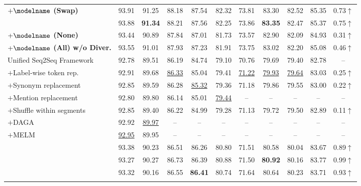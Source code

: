 \begin{table*}[th!]
{\begin{tabular}{lcccccccccc}
\multicolumn{1}{l}{\textbf{$+\modelname$ (Swap)}} &93.91	&91.25&	88.18	&87.54	&82.32	&73.81	&83.30	&82.52 &85.35 &\color{red}0.73$\uparrow$ \\
\rowcolor{gray!10}
\multicolumn{1}{l}{\textbf{$+\modelname$ (All)}} &93.88	&\textbf{91.34}  &	88.21	&87.56	&82.25	&73.86&	\textbf{83.35}&	82.47  &85.37 &\color{red}0.75$\uparrow$ \\
\cmidrule{2-11} 
\multicolumn{1}{l}{\textbf{$+\modelname$ (None)}} &93.44 &90.89 &87.84 &87.01 &81.73 &73.57 &82.90 &82.09  &84.93 &\color{red}0.31$\uparrow$ \\
\multicolumn{1}{l}{\textbf{$+\modelname$ (All) w/o Diver.}} &93.55 &91.01 &87.93 &87.23 &81.91 &73.75 &83.02 &82.20  &85.08 &\color{red}0.46$\uparrow$ \\
\midrule 
\midrule 
Unified Seq2Seq Framework &92.78 &89.51 &86.19 &84.74 &79.10 &70.76 &79.69 &79.40 &82.78 &-- \\
\multicolumn{1}{l}{$+$Label-wise token rep.} &92.91 &89.68 &\underline{86.33} &85.04 &79.41 &\underline{71.22} &\underline{79.93} &\underline{79.64} &83.03 &\color{red}0.25$\uparrow$ \\
\multicolumn{1}{l}{$+$Synonym replacement} &92.85 &89.59 &86.28 &\underline{85.32} &79.36 &71.18 &79.86 &79.55 &83.00 &\color{red}0.22$\uparrow$ \\
\multicolumn{1}{l}{$+$Mention replacement} &92.80 &89.80 &86.14 &85.01 &\underline{79.44} &-- &-- &-- &-- &--  \\
\multicolumn{1}{l}{$+$Shuffle within segments } &92.85 &89.40 &86.22 &84.99 &79.28 &71.13 &79.72 &79.50 &82.89 &\color{red}0.11$\uparrow$ \\
\multicolumn{1}{l}{$+$DAGA } &92.92 &\underline{89.97} &-- &-- &-- &-- &-- &-- &-- &--  \\
\multicolumn{1}{l}{$+$MELM } &\underline{92.95} &89.95 &-- &-- &-- &-- &-- &-- &-- &--  \\
\rowcolor{gray!10}
\multicolumn{1}{l}{\textbf{$+\modelname$ (Delete)}} &93.38 &90.23 &86.51 &86.26 &80.80 &71.51 &80.58 &80.04  &83.67 &\color{red}0.89$\uparrow$ \\
\rowcolor{gray!10}
\multicolumn{1}{l}{\textbf{$+\modelname$ (Add)}} &93.27 &90.27 &86.73 &86.39 &80.88 &71.50 &\textbf{80.92} &80.16  &83.77 &\color{red}0.99$\uparrow$ \\
\rowcolor{gray!10}
\multicolumn{1}{l}{\textbf{$+\modelname$ (Replace)}} &93.32 &90.16 &86.55 &\textbf{86.41} &80.74 &71.64 &80.64 &80.23 &83.71 &\color{red}0.93$\uparrow$ \\
\rowcolor{gray!10}

\end{tabular}}
\end{table*}
